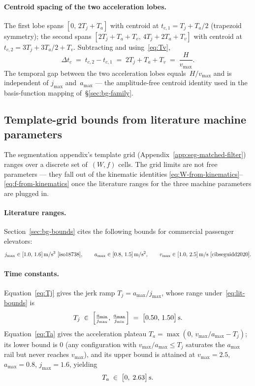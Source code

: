 \documentclass[manuscript,review,screen]{acmart}
\begin{document}
\paragraph{Centroid spacing of the two acceleration lobes.}
The first lobe spans $[0,\,2T_j+T_a]$ with centroid at
$t_{c,1}\!=\!T_j+T_a/2$ (trapezoid symmetry); the second spans
$[2T_j+T_a+T_v,\,4T_j+2T_a+T_v]$ with centroid at
$t_{c,2}\!=\!3T_j+3T_a/2+T_v$.  Subtracting and using~\eqref{eq:Tv},
\[
  \Delta t_{c}
  \;=\; t_{c,2}-t_{c,1}
  \;=\; 2T_j + T_a + T_v
  \;=\; \frac{H}{v_{\max}}.
\]
The temporal gap between the two acceleration lobes
equals~$H/v_{\max}$ and is independent of $j_{\max}$
and~$a_{\max}$ --- the amplitude-free centroid identity used in
the basis-function mapping of~\S\ref{sec:bg-family}.

\subsection{Template-grid bounds from literature machine parameters}
\label{app:template-grid-bounds}

The segmentation appendix's template grid
(Appendix~\ref{app:seg-matched-filter}) ranges over a discrete set
of~$(W,f)$ cells.  The grid limits are not free parameters --- they
fall out of the kinematic identities
\eqref{eq:W-from-kinematics}--\eqref{eq:f-from-kinematics} once the
literature ranges for the three machine parameters are plugged in.

\paragraph{Literature ranges.}
Section~\ref{sec:bg-bounds} cites the following bounds for commercial
passenger elevators:
\begin{equation}
  j_{\max}\in[1.0,\,1.6]\text{\,m/s$^3$~\cite{iso18738}},\qquad
  a_{\max}\in[0.8,\,1.5]\text{\,m/s$^2$},\qquad
  v_{\max}\in[1.0,\,2.5]\text{\,m/s~\cite{cibseguidd2020}}.
  \label{eq:lit-bounds}
\end{equation}

\paragraph{Time constants.}
Equation~\eqref{eq:Tj} gives the jerk ramp
$T_j=a_{\max}/j_{\max}$, whose range under~\eqref{eq:lit-bounds} is
\[
  T_j \;\in\;
  \left[\tfrac{a_{\min}}{j_{\max}},\,\tfrac{a_{\max}}{j_{\min}}\right]
  \;=\;
  \bigl[0.50,\,1.50\bigr]\text{\,s.}
\]
Equation~\eqref{eq:Ta} gives the acceleration plateau
$T_a=\max(0,\,v_{\max}/a_{\max}-T_j)$; its lower bound is $0$ (any
configuration with $v_{\max}/a_{\max}\le T_j$ saturates the
$a_{\max}$ rail but never reaches $v_{\max}$), and its upper bound
is attained at $v_{\max}\!=\!2.5$, $a_{\max}\!=\!0.8$,
$j_{\max}\!=\!1.6$, yielding
\[
  T_a \;\in\;\bigl[0,\;2.63\bigr]\text{\,s.}
\]
\end{document}
